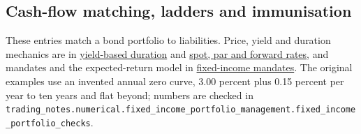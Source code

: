 \subsection{Cash-flow matching, ladders and immunisation}

These entries match a bond portfolio to liabilities. Price, yield and duration mechanics are in \hyperref[meth:yield-duration-pvbp]{yield-based duration} and \hyperref[meth:spot-par-forward-curves]{spot, par and forward rates}, and mandates and the expected-return model in \hyperref[def:fixed-income-mandates-return-model]{fixed-income mandates}. The original examples use an invented annual zero curve, 3.00 percent plus 0.15 percent per year to ten years and flat beyond; numbers are checked in \nolinkurl{trading_notes.numerical.fixed_income_portfolio_management.fixed_income_portfolio_checks}.

